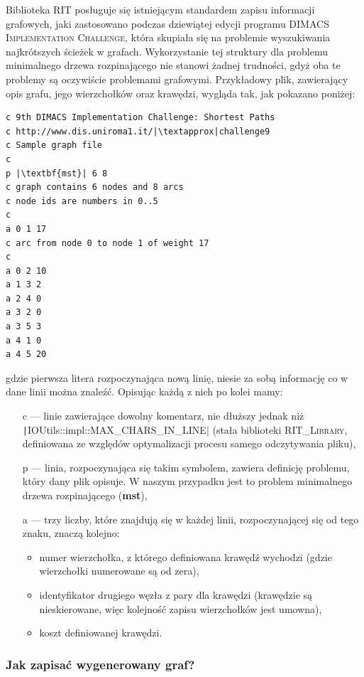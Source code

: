 Biblioteka \textsc{RIT} posługuje się istniejącym standardem zapisu informacji grafowych, jaki zastosowano podczas dziewiątej edycji programu \textsc{DIMACS Implementation Challenge}, która skupiała się na problemie wyszukiwania najkrótszych ścieżek w grafach. Wykorzystanie tej struktury dla problemu minimalnego drzewa rozpinającego nie stanowi żadnej trudności, gdyż oba te problemy są oczywiście problemami grafowymi. Przykładowy plik, zawierający opis grafu, jego wierzchołków oraz krawędzi, wygląda tak, jak pokazano poniżej:

\begin{verbatim}
c 9th DIMACS Implementation Challenge: Shortest Paths
c http://www.dis.uniroma1.it/|\textapprox|challenge9
c Sample graph file
c
p |\textbf{mst}| 6 8
c graph contains 6 nodes and 8 arcs
c node ids are numbers in 0..5
c
a 0 1 17
c arc from node 0 to node 1 of weight 17
c
a 0 2 10
a 1 3 2
a 2 4 0
a 3 2 0
a 3 5 3
a 4 1 0
a 4 5 20
\end{verbatim}
gdzie pierwsza litera rozpoczynająca nową linię, niesie za sobą informację co w dane linii można znaleźć. Opisując każdą z nich po kolei mamy:

\begin{itemize}
	\item[c] --- linie zawierające dowolny komentarz, nie dłuższy jednak niż \texttt|IOUtils::impl::MAX_CHARS_IN_LINE| (stała biblioteki \textsc{RIT\_Library}, definiowana ze względów optymalizacji procesu samego odczytywania pliku),
	\item[p] --- linia, rozpoczynająca się takim symbolem, zawiera definicję problemu, który dany plik opisuje. W naszym przypadku jest to problem minimalnego drzewa rozpinającego (\textbf{mst}),
	\item[a] --- trzy liczby, które znajdują się w każdej linii, rozpoczynającej się od tego znaku, znaczą kolejno:
	\begin{itemize}
		\item numer wierzchołka, z którego definiowana krawędź wychodzi (gdzie wierzchołki numerowane są od zera),
		\item identyfikator drugiego węzła z pary dla krawędzi (krawędzie są nieskierowane, więc kolejność zapisu wierzchołków jest umowna),
		\item koszt definiowanej krawędzi.
	\end{itemize}
\end{itemize}

\subsubsection{Jak zapisać wygenerowany graf?}

